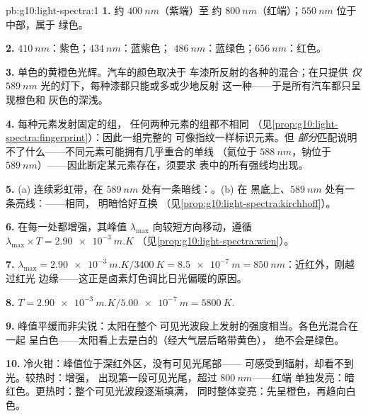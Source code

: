 \begin{solution}{pb:g10:light-spectra:1}
\textbf{1.} 约 $\qty{400}{nm}$（紫端）至
约 $\qty{800}{nm}$（红端）；$\qty{550}{nm}$ 位于中部，属于
绿色。

\textbf{2.} $\qty{410}{nm}$：紫色；$\qty{434}{nm}$：蓝紫色；
$\qty{486}{nm}$：蓝绿色；$\qty{656}{nm}$：红色。

\textbf{3.} 单色的黄橙色光辉。汽车的颜色取决于
车漆所反射的各种的混合；在只提供
\emph{仅}$\qty{589}{nm}$ 光的灯下，每种漆都只能或多或少地反射
这一种——于是所有汽车都只呈现橙色和
灰色的深浅。

\textbf{4.} 每种元素发射固定的组，
任何两种元素的组都不相同
（见\cref{prop:g10:light-spectra:fingerprint}）：因此一组完整的
可像指纹一样标识元素。但
\emph{部分}匹配说明不了什么——不同元素可能拥有几乎重合的单线
（氦位于 $\qty{588}{nm}$，钠位于
$\qty{589}{nm}$）——因此断定某元素存在，须要求
表中的所有强线均出现。

\textbf{5.} (a) 连续彩虹带，在
$\qty{589}{nm}$ 处有一条暗线：。(b) 在
黑底上、$\qty{589}{nm}$ 处有一条亮线：——相同，
明暗恰好互换
（见\cref{prop:g10:light-spectra:kirchhoff}）。

\textbf{6.} 在每一处都增强，其峰值
$\lambda_{\max}$ 向较短方向移动，遵循
$\lambda_{\max} \times T = \qty{2.90e-3}{m.K}$
（见\cref{prop:g10:light-spectra:wien}）。

\textbf{7.} $\lambda_{\max} = \qty{2.90e-3}{m.K} / \qty{3400}{K}
= \qty{8.5e-7}{m} = \qty{850}{nm}$：近红外，刚越过红光
边缘——这正是卤素灯色调比日光偏暖的原因。

\textbf{8.} $T = \qty{2.90e-3}{m.K} / \qty{5.00e-7}{m} = \qty{5800}{K}$.

\textbf{9.} 峰值平缓而非尖锐：太阳在整个
可见光波段上发射的强度相当。各色光混合在一起
呈白色——太阳看上去是白的（经大气层后略带黄色），
绝不会是绿色。

\textbf{10.} 冷火钳：峰值位于深红外区，没有可见光尾部——
可感受到辐射，却看不到光。较热时：增强，
出现第一段可见光尾，超过 $\qty{800}{nm}$——红端
单独发亮：暗红色。更热时：整个可见光波段逐渐填满，
同时整体变亮：先呈橙色，再趋向白色。


\end{solution}
